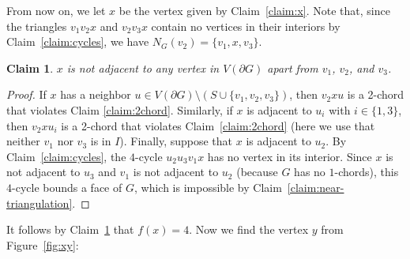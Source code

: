 \documentclass[11pt]{article}
\theoremstyle{slantthm}
\newtheorem{claim}{Claim}%
\numberwithin{equation}{section}
\theoremstyle{definition}
\numberwithin{equation}{section}
\newcommand{\0}{\varnothing}
\newcommand{\set}[1]{\{#1\}}
\newcommand{\bdry}[1]{{\partial #1}}
\begin{document}
    From now on, we let $x$ be the vertex given by Claim~\ref{claim:x}. Note that, since the triangles $v_1 v_2 x$ and $v_2 v_3 x$ contain no vertices in their interiors by Claim~\ref{claim:cycles}, we have $N_G(v_2) = \set{v_1, x, v_3}$.

    \begin{claim}\label{claim:no_other_neighbors}
        $x$ is not adjacent to any vertex in $V(\bdry{G})$ apart from $v_1$, $v_2$, and $v_3$.
    \end{claim}
    \begin{proof}
        If $x$ has a neighbor $u \in V(\bdry{G})\setminus (S \cup \set{v_1, v_2, v_3})$, then $v_2xu$ is a 2-chord that violates Claim \ref{claim:2chord}. %
        Similarly, if $x$ is adjacent to $u_i$ with $i \in \set{1, 3}$, then $v_2 x u_i$ is a 2-chord that violates Claim~\ref{claim:2chord} (here we use that neither $v_1$ nor $v_3$ is in $I$). %
        Finally, suppose that $x$ is adjacent to $u_2$. By Claim~\ref{claim:cycles}, the $4$-cycle $u_2 u_3 v_1 x$ has no vertex in its interior. Since $x$ is not adjacent to $u_3$ and $v_1$ is not adjacent to $u_2$ (because $G$ has no $1$-chords), this $4$-cycle bounds a face of $G$, which is impossible by Claim~\ref{claim:near-triangulation}. %
    \end{proof}

    It follows by Claim~\ref{claim:no_other_neighbors} that $f(x) = 4$. Now we find the vertex $y$ from Figure~\ref{fig:xy}:
\end{document}
